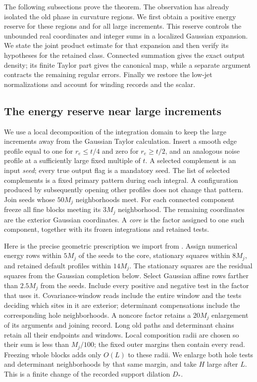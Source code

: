The following subsections prove the theorem.  The observation has already
isolated the old phase in curvature regions.  We first obtain a positive
energy reserve for these regions and for all large increments.  This
reserve controls the unbounded real coordinates and integer sums in a
localized Gaussian expansion.  We state the joint product estimate for
that expansion and then verify its hypotheses for the retained class.
Connected summation gives the exact output density; its finite Taylor
part gives the canonical map, while a separate argument contracts the
remaining regular errors.  Finally we restore the low-jet normalizations
and account for winding records and the scalar.

\subsection{The energy reserve near large increments}

We use a local decomposition of the integration domain to keep the large
increments away from the Gaussian Taylor calculation.  Insert a smooth
edge profile equal to one for $r_e\le t/4$ and zero for $r_e\ge t/2$,
and an analogous noise profile at a sufficiently large fixed multiple
of $t$.  A selected complement is an input \emph{seed}; every true
output flag is a mandatory seed.  The list of selected complements is
a fixed primary pattern during each integral.  A configuration produced
by subsequently opening other profiles does not change that pattern.
Join seeds whose $50M_j$ neighborhoods meet.  For each connected
component freeze all fine blocks meeting its $3M_j$ neighborhood.  The
remaining coordinates are the exterior Gaussian coordinates.  A
\emph{core} is the factor assigned to one such component, together with
its frozen integrations and retained tests.

Here is the precise geometric prescription we import from
\cite[Appendix ``Local sector factors and their complete supports'',
Subsections ``One metric and one assignment of each factor'' and
``The read sets of the prepared factors'']{SharpO4}.  Assign numerical
energy rows within $5M_j$ of the seeds to the core, stationary squares
within $8M_j$, and retained default profiles within $14M_j$.  The
stationary squares are the residual squares from the Gaussian completion
below.  Select Gaussian affine rows farther than $2.5M_j$ from the seeds.  Include every
positive and negative test in the factor that uses it.  Covariance-window
reads include the entire window and the tests deciding which sites in
it are exterior; determinant compensations include the corresponding
hole neighborhoods.  A noncore factor retains a $20M_j$ enlargement of
its arguments and joining record.  Long old paths and determinant chains
retain all their endpoints and windows.  Local composition radii are
chosen so their sum is less than $M_j/100$; the fixed outer margins then
contain every read.  Freezing whole blocks adds only $O(L)$ to these
radii.  We enlarge both hole tests and determinant neighborhoods by that
same margin, and take $H$ large after $L$.  This is a finite change of
the recorded support dilation $D_*$.

